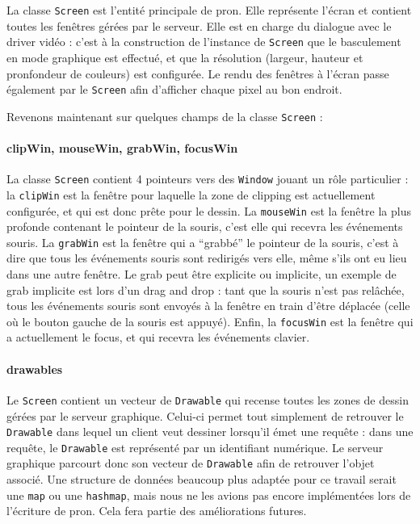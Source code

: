 La classe \verb|Screen| est l'entité principale de pron. Elle représente l'écran et contient toutes les fenêtres gérées par le serveur. Elle est en charge du dialogue avec le driver vidéo : c'est à la construction de l'instance de \verb|Screen| que le basculement en mode graphique est effectué, et que la résolution (largeur, hauteur et pronfondeur de couleurs) est configurée. Le rendu des fenêtres à l'écran passe également par le \verb|Screen| afin d'afficher chaque pixel au bon endroit.

Revenons maintenant sur quelques champs de la classe \verb|Screen| :
\paragraph{clipWin, mouseWin, grabWin, focusWin}
La classe \verb|Screen| contient 4 pointeurs vers des \verb|Window| jouant un rôle particulier : la \verb|clipWin| est la fenêtre pour laquelle la zone de clipping est actuellement configurée, et qui est donc prête pour le dessin. La \verb|mouseWin| est la fenêtre la plus profonde contenant le pointeur de la souris, c'est elle qui recevra les événements souris. La \verb|grabWin| est la fenêtre qui a ``grabbé'' le pointeur de la souris, c'est à dire que tous les événements souris sont redirigés vers elle, même s'ils ont eu lieu dans une autre fenêtre. Le grab peut être explicite ou implicite, un exemple de grab implicite est lors d'un drag and drop : tant que la souris n'est pas relâchée, tous les événements souris sont envoyés à la fenêtre en train d'être déplacée (celle où le bouton gauche de la souris est appuyé). Enfin, la \verb|focusWin| est la fenêtre qui a actuellement le focus, et qui recevra les événements clavier.

\paragraph{drawables}
Le \verb|Screen| contient un vecteur de \verb|Drawable| qui recense toutes les zones de dessin gérées par le serveur graphique. Celui-ci permet tout simplement de retrouver le \verb|Drawable| dans lequel un client veut dessiner lorsqu'il émet une requête : dans une requête, le \verb|Drawable| est représenté par un identifiant numérique. Le serveur graphique parcourt donc son vecteur de \verb|Drawable| afin de retrouver l'objet associé. Une structure de données beaucoup plus adaptée pour ce travail serait une \verb|map| ou une \verb|hashmap|, mais nous ne les avions pas encore implémentées lors de l'écriture de pron. Cela fera partie des améliorations futures.

